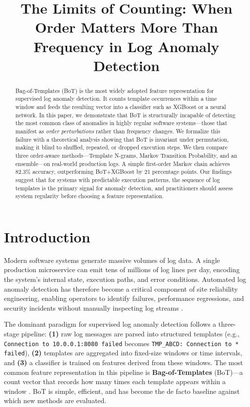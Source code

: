 \documentclass[11pt]{article}
\title{The Limits of Counting: When Order Matters More Than Frequency in Log Anomaly Detection}
\author{}
\date{}
\begin{document}
\maketitle

\begin{abstract}
Bag-of-Templates (BoT) is the most widely adopted feature representation for supervised log anomaly detection. 
It counts template occurrences within a time window and feeds the resulting vector into a classifier such as XGBoost or a neural network.
In this paper, we demonstrate that BoT is structurally incapable of detecting the most common class of anomalies in highly regular software systems---those that manifest as \emph{order perturbations} rather than frequency changes.
We formalize this failure with a theoretical analysis showing that BoT is invariant under permutation, making it blind to shuffled, repeated, or dropped execution steps.
We then compare three order-aware methods---Template N-grams, Markov Transition Probability, and an ensemble---on real-world production logs.
A simple first-order Markov chain achieves 82.3\% accuracy, outperforming BoT+XGBoost by 21 percentage points.
Our findings suggest that for systems with predictable execution patterns, the sequence of log templates is the primary signal for anomaly detection, and practitioners should assess system regularity before choosing a feature representation.
\end{abstract}

\section{Introduction}

Modern software systems generate massive volumes of log data. 
A single production microservice can emit tens of millions of log lines per day, encoding the system's internal state, execution paths, and error conditions.
Automated log anomaly detection has therefore become a critical component of site reliability engineering, enabling operators to identify failures, performance regressions, and security incidents without manually inspecting log streams \cite{he2016experience,zhang2019robust}.

The dominant paradigm for supervised log anomaly detection follows a three-stage pipeline:
\textbf{(1)} raw log messages are parsed into structured templates (e.g., \texttt{Connection to 10.0.0.1:8080 failed} becomes \texttt{TMP\_ABCD: Connection to * failed}), 
\textbf{(2)} templates are aggregated into fixed-size windows or time intervals, and 
\textbf{(3)} a classifier is trained on features derived from these windows.
The most common feature representation in this pipeline is \textbf{Bag-of-Templates} (BoT)---a count vector that records how many times each template appears within a window \cite{du2017deeplog,guo2021logbert,yang2021plelog}.
BoT is simple, efficient, and has become the de facto baseline against which new methods are evaluated.
\end{document}
